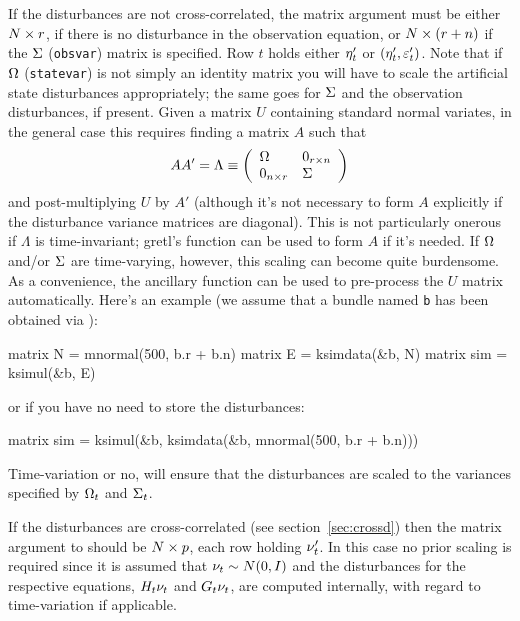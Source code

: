 If the disturbances are not cross-correlated, the matrix argument must
be either $N \times r$, if there is no disturbance in the
observation equation, or $N \times (r + n)$ if the
$\Sigma$ (\texttt{obsvar}) matrix is specified. Row $t$ holds either
$\eta_t'$ or $(\eta_t', \varepsilon_t')$. Note that if
$\Omega$ (\texttt{statevar}) is not simply an identity matrix you
will have to scale the artificial state disturbances appropriately;
the same goes for $\Sigma$ and the observation disturbances, if
present. Given a matrix $U$ containing standard normal variates, in
the general case this requires finding a matrix $A$ such that
\[
AA' = \Lambda \equiv \left(
\begin{array}{ll}
\Omega & 0_{r \times n} \\
0_{n\times r} & \Sigma
\end{array}
\right)
\]
and post-multiplying $U$ by $A'$ (although it's not necessary to form
$A$ explicitly if the disturbance variance matrices are
diagonal). This is not particularly onerous if $\Lambda$ is
time-invariant; gretl's  function can be used to form $A$
if it's needed. If $\Omega$ and/or $\Sigma$ are time-varying,
however, this scaling can become quite burdensome. As a convenience,
the ancillary function  can be used to pre-process the
$U$ matrix automatically. Here's an example (we assume that a bundle
named \texttt{b} has been obtained via ):
%
\begin{code}
matrix N = mnormal(500, b.r + b.n)
matrix E = ksimdata(&b, N)
matrix sim = ksimul(&b, E)
\end{code}
%
or if you have no need to store the disturbances:
%
\begin{code}
matrix sim = ksimul(&b, ksimdata(&b, mnormal(500, b.r + b.n)))
\end{code}
%
Time-variation or no,  will ensure that the disturbances
are scaled to the variances specified by $\Omega_t$ and
$\Sigma_t$.

If the disturbances are cross-correlated (see
section~\ref{sec:crossd}) then the matrix argument to 
should be $N \times p$, each row holding $\nu_t'$. In this case
no prior scaling is required since it is assumed that
$\nu_t \sim N(0, I)$ and the disturbances for the respective
equations, $H_t \nu_t$ and $G_t \nu_t$,
are computed internally, with regard to time-variation if applicable.

